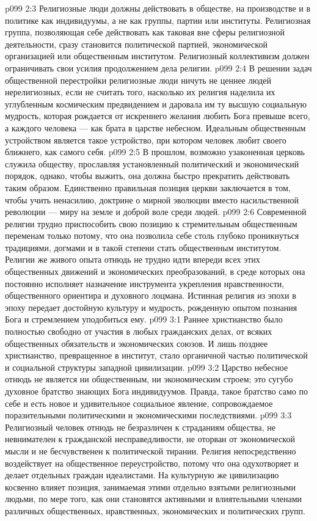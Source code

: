 \vs p099 2:3 \pc Религиозные люди должны действовать в обществе, на производстве и в политике как индивидуумы, а не как группы, партии или институты. Религиозная группа, позволяющая себе действовать как таковая вне сферы религиозной деятельности, сразу становится политической партией, экономической организацией или общественным институтом. Религиозный коллективизм должен ограничивать свои усилия продолжением дела религии.
\vs p099 2:4 В решении задач общественной перестройки религиозные люди ничуть не ценнее людей нерелигиозных, если не считать того, насколько их религия наделила их углубленным космическим предвидением и даровала им ту высшую социальную мудрость, которая рождается от искреннего желания любить Бога превыше всего, а каждого человека --- как брата в царстве небесном. Идеальным общественным устройством является такое устройство, при котором человек любит своего ближнего, как самого себя.
\vs p099 2:5 \pc В прошлом, возможно узаконенная церковь служила обществу, прославляя установленный политический и экономический порядок, однако, чтобы выжить, она должна быстро прекратить действовать таким образом. Единственно правильная позиция церкви заключается в том, чтобы учить ненасилию, доктрине о мирной эволюции вместо насильственной революции --- миру на земле и доброй воле среди людей.
\vs p099 2:6 Современной религии трудно приспособить свою позицию к стремительным общественным переменам только потому, что она позволила себе столь глубоко проникнуться традициями, догмами и в такой степени стать общественным институтом. Религии же живого опыта отнюдь не трудно идти впереди всех этих общественных движений и экономических преобразований, в среде которых она постоянно исполняет назначение инструмента укрепления нравственности, общественного ориентира и духовного лоцмана. Истинная религия из эпохи в эпоху передает достойную культуру и мудрость, рожденную опытом познания Бога и стремлением уподобиться ему.
\vs p099 3:1 Раннее христианство было полностью свободно от участия в любых гражданских делах, от всяких общественных обязательств и экономических союзов. И лишь позднее христианство, превращенное в институт, стало органичной частью политической и социальной структуры западной цивилизации.
\vs p099 3:2 \pc Царство небесное отнюдь не является ни общественным, ни экономическим строем; это сугубо духовное братство знающих Бога индивидуумов. Правда, такое братство само по себе и есть новое и удивительное социальное явление, сопровождаемое поразительными политическими и экономическими последствиями.
\vs p099 3:3 Религиозный человек отнюдь не безразличен к страданиям общества, не невнимателен к гражданской несправедливости, не оторван от экономической мысли и не бесчувственен к политической тирании. Религия непосредственно воздействует на общественное переустройство, потому что она одухотворяет и делает отдельных граждан идеалистами. На культурную же цивилизацию косвенно влияет позиция, занимаемая этими отдельно взятыми религиозными людьми, по мере того, как они становятся активными и влиятельными членами различных общественных, нравственных, экономических и политических групп.
